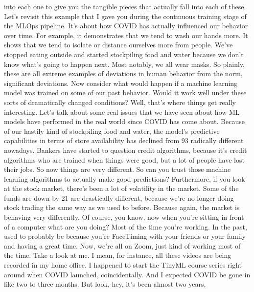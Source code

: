 {{{{{{{{    into each one to give you the tangible pieces that
    actually fall into each of these.
    Let's revisit this example that I gave you during the continuous training
    stage of the MLOps pipeline.
    It's about how COVID has actually influenced our behavior over time.
    For example, it demonstrates that we tend to wash our hands more.
    It shows that we tend to isolate or distance ourselves more from people.
    We've stopped eating outside and started stockpiling food and water
    because we don't know what's going to happen next.
    Most notably, we all wear masks.
    So plainly, these are all extreme examples
    of deviations in human behavior from the norm, significant deviations.
    Now consider what would happen if a machine learning model was
    trained on some of our past behavior.
    Would it work well under these sorts of dramatically changed conditions?
    Well, that's where things get really interesting.
    Let's talk about some real issues that we
    have seen about how ML models have performed in the real world since COVID
    has come about.
    Because of our hastily kind of stockpiling food and water,
    the model's predictive capabilities in terms of store availability
    has declined from 93%
    radically different nowadays.
    Bankers have started to question credit algorithms,
    because it's credit algorithms who are trained when things were good,
    but a lot of people have lost their jobs.
    So now things are very different.
    So can you trust those machine learning algorithms
    to actually make good predictions?
    Furthermore, if you look at the stock market,
    there's been a lot of volatility in the market.
    Some of the funds are down by 21%
    are drastically different, because we're no longer doing stock trading
    the same way as we used to before.
    Because again, the market is behaving very differently.
    Of course, you know, now when you're sitting in front of a computer
    what are you doing?
    Most of the time you're working.
    In the past, used to probably be because you're
    FaceTiming with your friends or your family and having a great time.
    Now, we're all on Zoom, just kind of working most of the time.
    Take a look at me.
    I mean, for instance, all these videos are being recorded in my home office.
    I happened to start the TinyML course series right around when
    COVID launched, coincidentally.
    And I expected COVID be gone in like two to three months.
    But look, hey, it's been almost two years,
}}}}}}}}
